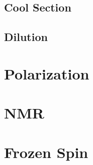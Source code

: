 \subsection{Cool \het{} Section}
\subsection{Dilution}

\section{Polarization}

\section{NMR}

\section{Frozen Spin}
\blindtext
